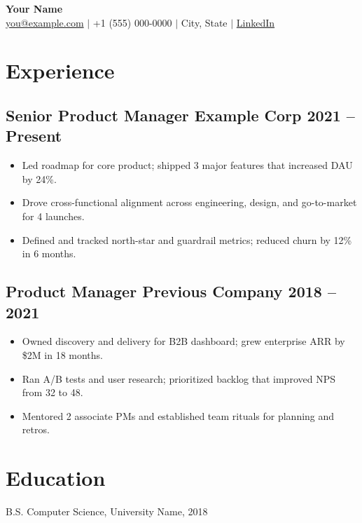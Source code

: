 \documentclass[11pt,letterpaper]{article}
\begin{document}
\begin{center}
  {\LARGE \textbf{Your Name}} \\
  \href{mailto:you@example.com}{you@example.com} \quad $|$ \quad
  +1 (555) 000-0000 \quad $|$ \quad
  City, State \quad $|$ \quad
  \href{https://linkedin.com/in/yourprofile}{LinkedIn}
\end{center}
\vspace{0.2em}

\section*{Experience}

\subsection*{Senior Product Manager \hfill Example Corp \hfill 2021 -- Present}
\begin{itemize}[leftmargin=*, nosep]
  \item Led roadmap for core product; shipped 3 major features that increased DAU by 24\%.
  \item Drove cross-functional alignment across engineering, design, and go-to-market for 4 launches.
  \item Defined and tracked north-star and guardrail metrics; reduced churn by 12\% in 6 months.
\end{itemize}

\subsection*{Product Manager \hfill Previous Company \hfill 2018 -- 2021}
\begin{itemize}[leftmargin=*, nosep]
  \item Owned discovery and delivery for B2B dashboard; grew enterprise ARR by \$2M in 18 months.
  \item Ran A/B tests and user research; prioritized backlog that improved NPS from 32 to 48.
  \item Mentored 2 associate PMs and established team rituals for planning and retros.
\end{itemize}

\section*{Education}
B.S. Computer Science, University Name, 2018
\end{document}
